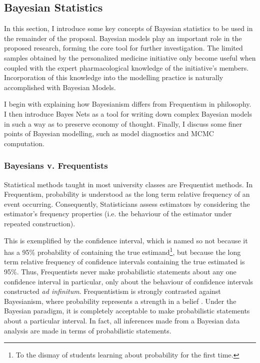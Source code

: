 \subsection{Bayesian Statistics}

In this section, I introduce some key concepts of Bayesian statistics to be used in the remainder of the proposal.  Bayesian models play an important role in the proposed research, forming the core tool for further investigation.  The limited samples obtained by the personalized medicine initiative only become useful when coupled with the expert pharmacological knowledge of the initiative's members.  Incorporation  of this knowledge into the modelling practice is naturally accomplished with Bayesian Models.

I begin with explaining how Bayesianism differs from Frequentism in philosophy.  I then introduce Bayes Nets as a tool for writing down complex Bayesian models in such a way as to preserve economy of thought.  Finally, I discuss some finer points of Bayesian modelling, such as model diagnostics and MCMC computation.


\subsubsection{Bayesians v. Frequentists}

Statistical methods taught in most  university classes are Frequentist methods.  In Frequentism, probability is understood as the long term relative frequency of an event occurring.  Consequently, Statisticians assess estimators by considering the estimator's frequency properties (i.e. the behaviour of the estimator under repeated construction).  

This is exemplified by the confidence interval, which is named so not because it has a 95\% probability of containing the true estimand\footnote{To the dismay of students learning about probability for the first time.}, but because the long term relative frequency of confidence intervals containing the true estimated is 95\%.  Thus, Frequentists never make probabilistic statements about any one confidence interval in particular, only about the behaviour of confidence intervals constructed \textit{ad infinitum}.  Frequentistism is strongly contrasted against Bayesianism, where probability represents a strength in a belief \cite{gelman2013bayesian}.  Under the Bayesian paradigm, it is completely acceptable to make probabilistic statements about a particular interval.  In fact, all inferences made from a Bayesian data analysis are made in terms of probabilistic statements.


